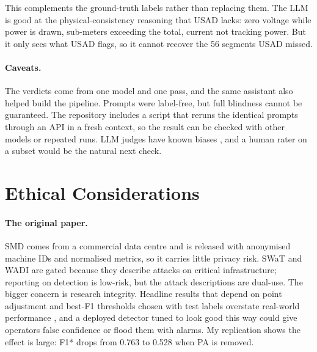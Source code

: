 \documentclass[11pt]{article}
\begin{document}
This complements the ground-truth labels rather than replacing them. The LLM is good at the physical-consistency reasoning that USAD lacks: zero voltage while power is drawn, sub-meters exceeding the total, current not tracking power. But it only sees what USAD flags, so it cannot recover the 56 segments USAD missed.

\paragraph{Caveats.} The verdicts come from one model and one pass, and the same assistant also helped build the pipeline. Prompts were label-free, but full blindness cannot be guaranteed. The repository includes a script that reruns the identical prompts through an API in a fresh context, so the result can be checked with other models or repeated runs. LLM judges have known biases \citep{zheng2023judging}, and a human rater on a subset would be the natural next check.

\section{Ethical Considerations}
\label{sec:ethics}

\paragraph{The original paper.} SMD comes from a commercial data centre and is released with anonymised machine IDs and normalised metrics, so it carries little privacy risk. SWaT and WADI are gated because they describe attacks on critical infrastructure; reporting on detection is low-risk, but the attack descriptions are dual-use. The bigger concern is research integrity. Headline results that depend on point adjustment and best-F1 thresholds chosen with test labels overstate real-world performance \citep{kim2022rigorous,wu2023flawed}, and a deployed detector tuned to look good this way could give operators false confidence or flood them with alarms. My replication shows the effect is large: F1* drops from 0.763 to 0.528 when PA is removed.
\end{document}
